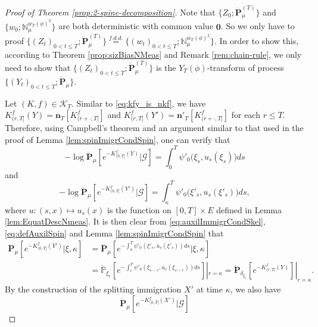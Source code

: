 \documentclass[UTF8]{pkuthss}
\theoremstyle{plain}
\theoremstyle{definition}
\numberwithin{equation}{section}
\begin{document}
\begin{proof}[Proof of Theorem \ref{prop:2-spine-decomposition}]
 Note that $\{Z_0;\ddot{\mathbf P}^{(T)}_\mu\}$ and $\{w_0;\mathbb N^{w_T(\phi)^2}_\mu\}$ are both deterministic with common value $\mathbf 0$.
	So we only have to proof
$
	\{(Z_t)_{0< t\leq T};\ddot{\mathbf P}^{(T)}_\mu\} \overset{f.d.d.}{=} \{(w_t)_{0<t\leq T};\mathbb N^{w_T(\phi)^2}_\mu\}.	
$
	In order to show this, according to Theorem \ref{prop:sizBiasNMeas} and Remark \ref{rem:chain-rule}, we only need to show that
$\{(Z_t)_{0< t\leq T};\ddot{\mathbf P}^{(T)}_\mu\}$ is the $Y_T(\phi)$-transform of process $\{(Y_t)_{0< t\leq T}; \dot {\mathbf P}_\mu\}$.
\par
 Let $(K,f)\in \mathcal K_T$. 
 Similar to \eqref{eq:kfy_is_nkf}, 
 we have $K_{(r, T]}^f(Y) = \mathbf n_T[K^f_{(r+\cdot, T]}]$ and $K_{(r, T]}^f(Y') = \mathbf n'_T[K^f_{(r+\cdot, T]}]$ for each $r\leq T$.
	Therefore, 
using Campbell's theorem and an argument similar to that used in the proof of Lemma \ref{lem:spinImigrCondSpin}, 
	one can verify that
\begin{equation}\label{eq:mainImmigrCondSkel}
	- \log\ddot {\mathbf P}_\mu [e^{-K^f_{(0, T]}(Y)}|\mathscr G]
	=
	 \int_0^T\psi'_0\big(\xi_s,u_s(\xi_s)\big)ds
\end{equation}
	and
\begin{equation}\label{eq:auxilImmigrCondSkel}
	- \log\ddot {\mathbf P}_\mu [e^{-K^f_{(0, T]}(Y')}|\mathscr G]
	=
 \int_\kappa^T \psi'_0\big(\xi'_s,u_s(\xi'_s)\big)ds,
\end{equation}
	where $u:(s,x)\mapsto u_s(x)$ is the function on $[0,T]\times E$ defined in Lemma \ref{lem:EquatDescNmeas}.
	It is then clear from \eqref{eq:auxilImmigrCondSkel}, \eqref{eq:defAuxilSpin} and Lemma \ref{lem:spinImigrCondSpin} that
\begin{equation}
\label{eq:auxilImmigrCondMainSpin}
\begin{split}
    \ddot{\mathbf P}_\mu[e^{-K^f_{(0, T]}(Y')}|\xi,\kappa]
	&= \ddot{\mathbf P}_\mu[e^{-\int_\kappa^T\psi'_0(\xi'_s,u_s(\xi'_s))ds}|\xi,\kappa]\\
	&= \dot{\mathbb P}_{\xi_r}[e^{-\int_r^T\psi'_0(\xi_{s-r},u_s(\xi_{s-r}))ds}]|_{r=\kappa}
	= \dot{\mathbf P}_{\delta_{\xi_r}} [e^{-K^f_{(r, T]}(Y)}]|_{r=\kappa}.
\end{split}\end{equation}
	By the construction of the splitting immigration $X'$ at time $\kappa$, we also have
\begin{equation}\label{eq:oneTimImmigrCondSkel}
    \ddot {\mathbf P}_\mu[e^{-K^f_{(0, T]}(X')}|\mathscr G ]

\end{equation}
\end{proof}
\end{document}
